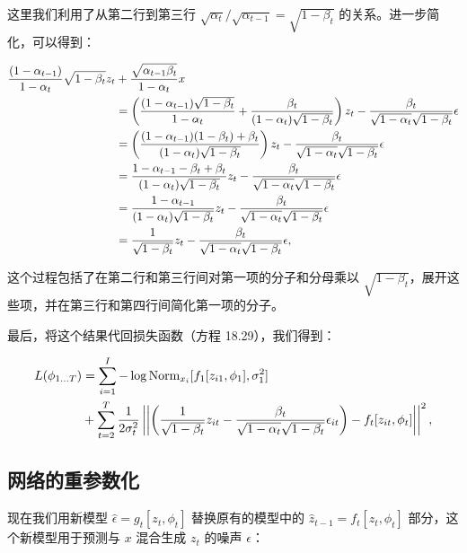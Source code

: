 \documentclass[lang=cn,newtx,10pt,scheme=chinese]{elegantbook}
\begin{document}
这里我们利用了从第二行到第三行 \(\sqrt{\alpha_t} / \sqrt{\alpha_{t-1}} = \sqrt{1 - \beta_t}\) 的关系。进一步简化，可以得到：

\begin{align}
\frac{(1 - \alpha_{t-1})}{1 - \alpha_t} \sqrt{1 - \beta_t} z_t &+ \frac{\sqrt{\alpha_{t-1}\beta_t}}{1 - \alpha_t} x  \notag \\
&= \left( \frac{(1 - \alpha_{t-1})\sqrt{1 - \beta_t}}{1 - \alpha_t} + \frac{\beta_t}{(1 - \alpha_t)\sqrt{1 - \beta_t}} \right) z_t - \frac{\beta_t}{\sqrt{1 - \alpha_t}\sqrt{1 - \beta_t}} \epsilon \notag \\
&= \left( \frac{(1 - \alpha_{t-1})(1 - \beta_t) + \beta_t}{(1 - \alpha_t)\sqrt{1 - \beta_t}} \right) z_t - \frac{\beta_t}{\sqrt{1 - \alpha_t}\sqrt{1 - \beta_t}} \epsilon \notag \\
&= \frac{1 - \alpha_{t-1} - \beta_t + \beta_t}{(1 - \alpha_t)\sqrt{1 - \beta_t}} z_t - \frac{\beta_t}{\sqrt{1 - \alpha_t}\sqrt{1 - \beta_t}} \epsilon \notag \\
&= \frac{1 - \alpha_{t-1}}{(1 - \alpha_t)\sqrt{1 - \beta_t}} z_t - \frac{\beta_t}{\sqrt{1 - \alpha_t}\sqrt{1 - \beta_t}} \epsilon \notag \\
&= \frac{1}{\sqrt{1 - \beta_t}} z_t - \frac{\beta_t}{\sqrt{1 - \alpha_t}\sqrt{1 - \beta_t}} \epsilon, 
\end{align} 



这个过程包括了在第二行和第三行间对第一项的分子和分母乘以 \(\sqrt{1 - \beta_t}\)，展开这些项，并在第三行和第四行间简化第一项的分子。

最后，将这个结果代回损失函数（方程 18.29），我们得到：

\begin{align}
L(\phi_{1...T}) &= \sum_{i=1}^I -\log \text{Norm}_{x_i} [f_1[z_{i1}, \phi_1], \sigma^2_{1}] \notag \\
&+ \sum_{t=2}^T \frac{1}{2\sigma^2_t} \left| \left| \left( \frac{1}{\sqrt{1 - \beta_t}}z_{it} - \frac{\beta_t}{\sqrt{1 - \alpha_t}\sqrt{1 - \beta_t}}\epsilon_{it} \right) - f_t[z_{it}, \phi_t] \right| \right|^2, 
\end{align}

\subsection{网络的重参数化}
现在我们用新模型 \(\hat{\epsilon} = g_t[z_t, \phi_t]\) 替换原有的模型中的 \(\hat{z}_{t-1} = f_t[z_t, \phi_t]\) 部分，这个新模型用于预测与 \(x\) 混合生成 \(z_t\) 的噪声 \(\epsilon\)：
\end{document}
